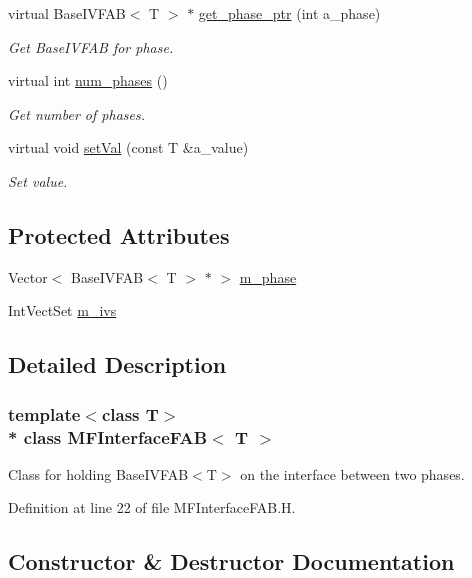 \begin{DoxyCompactItemize}
virtual Base\+I\+V\+F\+AB$<$ T $>$ $\ast$ \hyperlink{classMFInterfaceFAB_a3d01e30ea3f5398fae210e0b39082e64}{get\+\_\+phase\+\_\+ptr} (int a\+\_\+phase)
\begin{DoxyCompactList}\small\item\em Get Base\+I\+V\+F\+AB for phase. \end{DoxyCompactList}\item 
virtual int \hyperlink{classMFInterfaceFAB_a019badcc5ee03dce92467c523e5471c7}{num\+\_\+phases} ()
\begin{DoxyCompactList}\small\item\em Get number of phases. \end{DoxyCompactList}\item 
virtual void \hyperlink{classMFInterfaceFAB_a4d256626080c52a65be0c6b35e8fee17}{set\+Val} (const T \&a\+\_\+value)
\begin{DoxyCompactList}\small\item\em Set value. \end{DoxyCompactList}\end{DoxyCompactItemize}
\subsection*{Protected Attributes}
\begin{DoxyCompactItemize}
\item 
Vector$<$ Base\+I\+V\+F\+AB$<$ T $>$ $\ast$ $>$ \hyperlink{classMFInterfaceFAB_a1db6bd48d72b77110541b3193c3741fa}{m\+\_\+phase}
\item 
Int\+Vect\+Set \hyperlink{classMFInterfaceFAB_a82646e4c1c0583f76fd9e3eb5d78d9fc}{m\+\_\+ivs}
\end{DoxyCompactItemize}


\subsection{Detailed Description}
\subsubsection*{template$<$class T$>$\\*
class M\+F\+Interface\+F\+A\+B$<$ T $>$}

Class for holding Base\+I\+V\+F\+A\+B$<$\+T$>$ on the interface between two phases. 

Definition at line 22 of file M\+F\+Interface\+F\+A\+B.\+H.



\subsection{Constructor \& Destructor Documentation}
